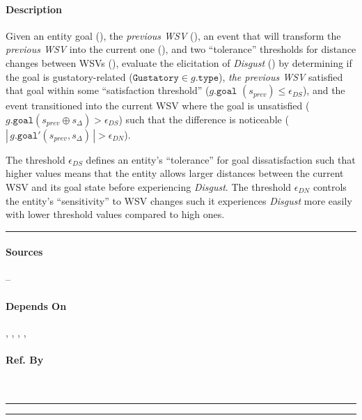 \paragraph{Description} Given an entity goal (), the
\textit{previous WSV} (), an event that will transform the
\textit{previous WSV} into the current one (), and
two ``tolerance'' thresholds for distance changes between WSVs
(), evaluate the elicitation of
\textit{Disgust} () by determining if the goal is
gustatory-related ($\mathtt{Gustatory} \in g.\mathtt{type}$), \textit{the
previous WSV} satisfied that goal within some ``satisfaction threshold''
($g.\mathtt{goal}$ $(s_{prev}) \leq \epsilon_{DS}$), and the event transitioned
into the current WSV where the goal is unsatisfied ($g.\mathtt{goal}(s_{prev}
\oplus s_\Delta) > \epsilon_{DS}$) such that the difference is noticeable
($| \, g.\mathtt{goal'}(s_{prev}, s_\Delta) \, | > \epsilon_{DN}$).

The threshold $\epsilon_{DS}$ defines an entity's ``tolerance'' for goal
dissatisfaction such that higher values means that the entity allows larger
distances between the current WSV and its goal state before experiencing
\textit{Disgust}. The threshold $\epsilon_{DN}$ controls the entity's
``sensitivity'' to WSV changes such it experiences \textit{Disgust} more easily
with lower threshold values compared to high ones. \\\hrule

\paragraph{Sources} --

\paragraph{Depends On} , ,
, ,

\paragraph{Ref. By}  \\\hrule\vspace{0.5mm}\hrule

~\newline

